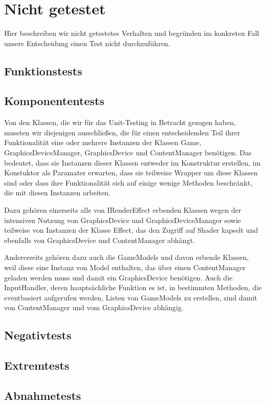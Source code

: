 %



\section{Nicht getestet}
\label{Abschnitt:Tests:Protokoll:Nicht_durchgefuehrt}

Hier beschreiben wir nicht getestetes Verhalten und begründen im konkreten Fall unsere Entscheidung einen Test nicht durchzuführen.


%

\subsection*{Funktionstests}



\subsection*{Komponententests}

Von den Klassen, die wir für das Unit-Testing in Betracht gezogen haben, mussten wir diejenigen ausschließen, die für einen entscheidenden Teil ihrer Funktionalität eine oder mehrere Instanzen der Klassen Game, GraphicsDeviceManager, GraphicsDevice und ContentManager benötigen. Das bedeutet, dass sie Instanzen dieser Klassen entweder im Konstruktur erstellen, im Konstuktor als Paramater erwarten, dass sie teilweise Wrapper um diese Klassen sind oder dass ihre Funktionalität sich auf einige wenige Methoden beschränkt, die mit diesen Instanzen arbeiten.

Dazu gehören einerseits alle von IRenderEffect erbenden Klassen wegen der intensiven Nutzung von GraphicsDevice und GraphicsDeviceManager sowie teilweise von Instanzen der Klasse Effect, das den Zugriff auf Shader kapselt und ebenfalls von GraphicsDevice und ContentManager abhängt.

Andererseits gehören dazu auch die GameModels und davon erbende Klassen, weil diese eine Instanz von Model enthalten, das über einen ContentManager geladen werden muss und damit ein GraphicsDevice benötigen. Auch die InputHandler, deren hauptsächliche Funktion es ist, in bestimmten Methoden, die eventbasiert aufgerufen werden, Listen von GameModels zu erstellen, sind damit von ContentManager und vom GraphicsDevice abhängig.



\subsection*{Negativtests}
\subsection*{Extremtests}
\subsection*{Abnahmetests}



